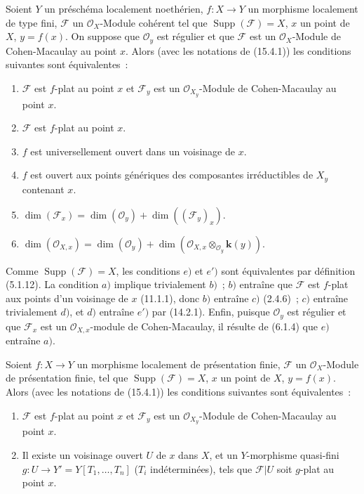\begin{proposition}[15.4.2]
\label{IV.15.4.2-fr}
Soient $Y$ un préschéma localement noethérien, $f:X\to Y$ un morphisme localement
de type fini, $\mathcal F$ un $\mathcal O_X$-Module cohérent tel que
$\operatorname{Supp}(\mathcal F)=X$, $x$ un point de $X$, $y=f(x)$. On suppose
que $\mathcal O_y$ est régulier et que $\mathcal F$ est un $\mathcal O_X$-Module
de Cohen-Macaulay au point $x$. Alors (avec les notations de (15.4.1)) les
conditions suivantes sont équivalentes~:
\begin{enumerate}[label=\emph{\alph*})]
  \item $\mathcal F$ est $f$-plat au point $x$ et $\mathcal F_y$ est un
  $\mathcal O_{X_y}$-Module de Cohen-Macaulay au point $x$.
  \item $\mathcal F$ est $f$-plat au point $x$.
  \item $f$ est universellement ouvert dans un voisinage de $x$.
  \item $f$ est ouvert aux points génériques des composantes irréductibles de
  $X_y$ contenant $x$.
  \item $\dim(\mathcal F_x)=\dim(\mathcal O_y)+\dim((\mathcal F_y)_x)$.
  \item[\emph{e}$'$)]
  $\dim(\mathcal O_{X,x})=\dim(\mathcal O_y)+
  \dim(\mathcal O_{X,x}\otimes_{\mathcal O_y}\mathbf{k}(y))$.
\end{enumerate}
Comme $\operatorname{Supp}(\mathcal F)=X$, les conditions $e)$ et $e')$ sont
équivalentes par définition (5.1.12). La condition $a)$ implique trivialement
$b)$~; $b)$ entraîne que $\mathcal F$ est $f$-plat aux points d'un voisinage de
$x$ (11.1.1), donc $b)$ entraîne $c)$ (2.4.6)~; $c)$ entraîne trivialement $d)$,
et $d)$ entraîne $e')$ par (14.2.1). Enfin, puisque $\mathcal O_y$ est régulier
et que $\mathcal F_x$ est un $\mathcal O_{X,x}$-module de Cohen-Macaulay, il
résulte de (6.1.4) que $e)$ entraîne $a)$.
\end{proposition}

\begin{proposition}[15.4.3]
\label{IV.15.4.3-fr}
Soient $f:X\to Y$ un morphisme localement de présentation finie, $\mathcal F$ un
$\mathcal O_X$-Module de présentation finie, tel que
$\operatorname{Supp}(\mathcal F)=X$, $x$ un point de $X$, $y=f(x)$. Alors (avec
les notations de (15.4.1)) les conditions suivantes sont équivalentes~:
\begin{enumerate}[label=\emph{\alph*})]
  \item $\mathcal F$ est $f$-plat au point $x$ et $\mathcal F_y$ est un
  $\mathcal O_{X_y}$-Module de Cohen-Macaulay au point $x$.
  \item Il existe un voisinage ouvert $U$ de $x$ dans $X$, et un $Y$-morphisme
  quasi-fini $g:U\to Y'=Y[T_1,\ldots,T_n]$ ($T_i$ indéterminées), tels que
  $\mathcal F|U$ soit $g$-plat au point $x$.
\end{enumerate}
\end{proposition}

